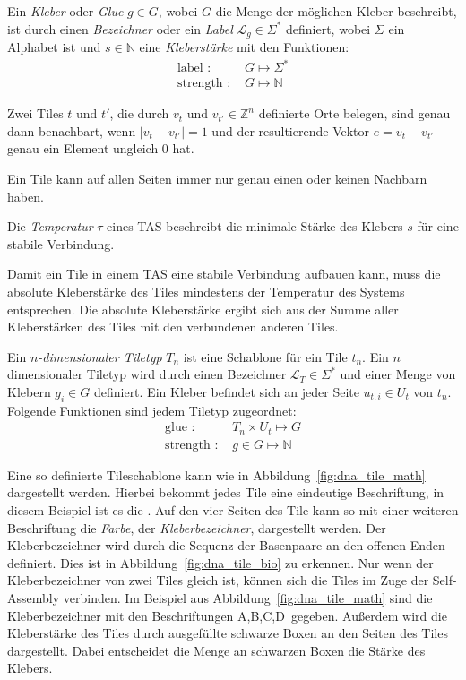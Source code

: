 \begin{definition}
	Ein \emph{Kleber} oder \emph{Glue} $g\in G$, wobei $G$ die Menge der möglichen Kleber beschreibt, ist durch einen \emph{Bezeichner} oder ein \emph{Label} $\mathcal{L}_g\in\Sigma^*$ definiert, wobei $\Sigma$ ein Alphabet ist und $s\in\mathbb{N}$ eine \emph{Kleberstärke} mit den Funktionen:
	\begin{align*}
		\text{label : }& G\mapsto\Sigma^* \\
		\text{strength : }& G\mapsto\mathbb{N}
	\end{align*}
\end{definition}
\begin{definition}
	Zwei Tiles $t$ und $t'$, die durch $v_t$ und $v_{t'}\in\mathbb{Z}^n$ definierte Orte belegen, sind genau dann benachbart, wenn $|v_t-v_{t'}| = 1$ und der resultierende Vektor $e = v_t-v_{t'}$ genau ein Element ungleich $0$ hat.
\end{definition}
Ein Tile kann auf allen Seiten immer nur genau einen oder keinen Nachbarn haben.
\begin{definition}
	Die \emph{Temperatur} $\tau$ eines TAS beschreibt die minimale Stärke des Klebers $s$ für eine stabile Verbindung.
\end{definition}
Damit ein Tile in einem TAS eine stabile Verbindung aufbauen kann, muss die absolute Kleberstärke des Tiles mindestens der Temperatur des Systems entsprechen. Die absolute Kleberstärke ergibt sich aus der Summe aller Kleberstärken des Tiles mit den verbundenen anderen Tiles.
\begin{definition}
	Ein \emph{$n$-dimensionaler Tiletyp} $T_n$ ist eine Schablone für ein Tile $t_n$. Ein $n$ dimensionaler Tiletyp wird durch einen Bezeichner $\mathcal{L}_T\in\Sigma^*$ und einer Menge von Klebern $g_i\in G$ definiert. Ein Kleber befindet sich an jeder Seite $u_{t,i}\in U_t$ von $t_n$. Folgende Funktionen sind jedem Tiletyp zugeordnet:
	\begin{align*}
		\text{glue : }& T_n\times U_t\mapsto G \\
		\text{strength : }& g\in G \mapsto \mathbb{N}
	\end{align*}
\end{definition} 
Eine so definierte Tileschablone kann wie in Abbildung~\ref{fig:dna_tile_math} dargestellt werden. 
Hierbei bekommt jedes Tile eine eindeutige Beschriftung, in diesem Beispiel ist es die \grqq.
Auf den vier Seiten des Tile kann so mit einer weiteren Beschriftung die \emph{Farbe}, der \emph{Kleberbezeichner}, dargestellt werden.
Der Kleberbezeichner wird durch die Sequenz der Basenpaare an den offenen Enden definiert. Dies ist in Abbildung~\ref{fig:dna_tile_bio} zu erkennen. 
Nur wenn der Kleberbezeichner von zwei Tiles gleich ist, können sich die Tiles im Zuge der Self-Assembly verbinden. 
Im Beispiel aus Abbildung~\ref{fig:dna_tile_math} sind die Kleberbezeichner mit den Beschriftungen \glqq A,B,C,D\grqq\, gegeben. 
Außerdem wird die Kleberstärke des Tiles durch ausgefüllte schwarze Boxen an den Seiten des Tiles dargestellt. 
Dabei entscheidet die Menge an schwarzen Boxen die Stärke des Klebers.

